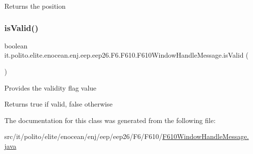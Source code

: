 \begin{DoxyReturn}{Returns}
the position 
\end{DoxyReturn}
\hypertarget{classit_1_1polito_1_1elite_1_1enocean_1_1enj_1_1eep_1_1eep26_1_1_f6_1_1_f610_1_1_f610_window_handle_message_ad6cfb1d1fcdc8d229ba87cd783cc3279}{}\label{classit_1_1polito_1_1elite_1_1enocean_1_1enj_1_1eep_1_1eep26_1_1_f6_1_1_f610_1_1_f610_window_handle_message_ad6cfb1d1fcdc8d229ba87cd783cc3279} 
\subsubsection{\texorpdfstring{is\+Valid()}{isValid()}}
{\footnotesize\ttfamily boolean it.\+polito.\+elite.\+enocean.\+enj.\+eep.\+eep26.\+F6.\+F610.\+F610\+Window\+Handle\+Message.\+is\+Valid (\begin{DoxyParamCaption}{ }\end{DoxyParamCaption})}

Provides the validity flag value

\begin{DoxyReturn}{Returns}
true if valid, false otherwise 
\end{DoxyReturn}


The documentation for this class was generated from the following file\+:\begin{DoxyCompactItemize}
\item 
src/it/polito/elite/enocean/enj/eep/eep26/\+F6/\+F610/\hyperlink{_f610_window_handle_message_8java}{F610\+Window\+Handle\+Message.\+java}\end{DoxyCompactItemize}
